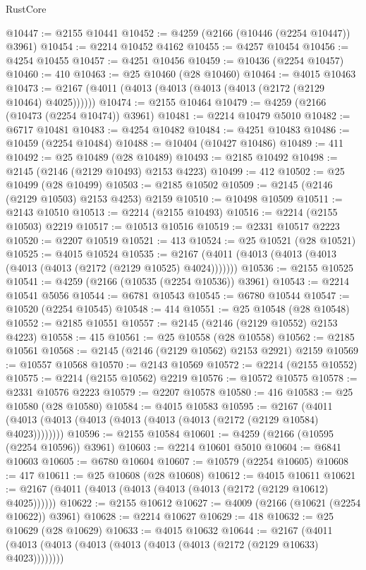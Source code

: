 \begin{lexlean}{RustCore}
\begin{coremodule}
@10447 := @2155 @10441
@10452 := @4259 (@2166 (@10446 (@2254 @10447)) @3961)
@10454 := @2214 @10452 @4162
@10455 := @4257 @10454
@10456 := @4254 @10455
@10457 := @4251 @10456
@10459 := @10436 (@2254 @10457)
@10460 := 410
@10463 := @25 @10460 (@28 @10460)
@10464 := @4015 @10463
@10473 := @2167 (@4011 (@4013 (@4013 (@4013 (@4013 (@2172 (@2129 @10464) @4025))))))
@10474 := @2155 @10464
@10479 := @4259 (@2166 (@10473 (@2254 @10474)) @3961)
@10481 := @2214 @10479 @5010
@10482 := @6717 @10481
@10483 := @4254 @10482
@10484 := @4251 @10483
@10486 := @10459 (@2254 @10484)
@10488 := @10404 (@10427 @10486)
@10489 := 411
@10492 := @25 @10489 (@28 @10489)
@10493 := @2185 @10492
@10498 := @2145 (@2146 (@2129 @10493) @2153 @4223)
@10499 := 412
@10502 := @25 @10499 (@28 @10499)
@10503 := @2185 @10502
@10509 := @2145 (@2146 (@2129 @10503) @2153 @4253) @2159
@10510 := @10498 @10509
@10511 := @2143 @10510
@10513 := @2214 (@2155 @10493)
@10516 := @2214 (@2155 @10503) @2219
@10517 := @10513 @10516
@10519 := @2331 @10517 @2223
@10520 := @2207 @10519
@10521 := 413
@10524 := @25 @10521 (@28 @10521)
@10525 := @4015 @10524
@10535 := @2167 (@4011 (@4013 (@4013 (@4013 (@4013 (@4013 (@2172 (@2129 @10525) @4024)))))))
@10536 := @2155 @10525
@10541 := @4259 (@2166 (@10535 (@2254 @10536)) @3961)
@10543 := @2214 @10541 @5056
@10544 := @6781 @10543
@10545 := @6780 @10544
@10547 := @10520 (@2254 @10545)
@10548 := 414
@10551 := @25 @10548 (@28 @10548)
@10552 := @2185 @10551
@10557 := @2145 (@2146 (@2129 @10552) @2153 @4223)
@10558 := 415
@10561 := @25 @10558 (@28 @10558)
@10562 := @2185 @10561
@10568 := @2145 (@2146 (@2129 @10562) @2153 @2921) @2159
@10569 := @10557 @10568
@10570 := @2143 @10569
@10572 := @2214 (@2155 @10552)
@10575 := @2214 (@2155 @10562) @2219
@10576 := @10572 @10575
@10578 := @2331 @10576 @2223
@10579 := @2207 @10578
@10580 := 416
@10583 := @25 @10580 (@28 @10580)
@10584 := @4015 @10583
@10595 := @2167 (@4011 (@4013 (@4013 (@4013 (@4013 (@4013 (@4013 (@2172 (@2129 @10584) @4023))))))))
@10596 := @2155 @10584
@10601 := @4259 (@2166 (@10595 (@2254 @10596)) @3961)
@10603 := @2214 @10601 @5010
@10604 := @6841 @10603
@10605 := @6780 @10604
@10607 := @10579 (@2254 @10605)
@10608 := 417
@10611 := @25 @10608 (@28 @10608)
@10612 := @4015 @10611
@10621 := @2167 (@4011 (@4013 (@4013 (@4013 (@4013 (@2172 (@2129 @10612) @4025))))))
@10622 := @2155 @10612
@10627 := @4009 (@2166 (@10621 (@2254 @10622)) @3961)
@10628 := @2214 @10627
@10629 := 418
@10632 := @25 @10629 (@28 @10629)
@10633 := @4015 @10632
@10644 := @2167 (@4011 (@4013 (@4013 (@4013 (@4013 (@4013 (@4013 (@2172 (@2129 @10633) @4023))))))))

\end{coremodule}
\end{lexlean}
